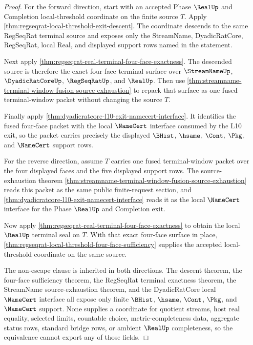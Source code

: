 \begin{proof}
For the forward direction, start with an accepted Phase $\RealUp$ and Completion local-threshold coordinate on the finite source $T$. Apply \autoref{thm:regseqrat-local-threshold-exit-descent}. The coordinate descends to the same RegSeqRat terminal source and exposes only the StreamName, DyadicRatCore, RegSeqRat, local Real, and displayed support rows named in the statement.

Next apply \autoref{thm:regseqrat-real-terminal-four-face-exactness}. The descended source is therefore the exact four-face terminal surface over $\StreamNameUp$, $\DyadicRatCoreUp$, $\RegSeqRatUp$, and $\RealUp$. Then use \autoref{thm:streamname-terminal-window-fusion-source-exhaustion} to repack that surface as one fused terminal-window packet without changing the source $T$.

Finally apply \autoref{thm:dyadicratcore-l10-exit-namecert-interface}. It identifies the fused four-face packet with the local $\NameCert$ interface consumed by the L10 exit, so the packet carries precisely the displayed $\BHist$, $\hsame$, $\Cont$, $\Pkg$, and $\NameCert$ support rows.

For the reverse direction, assume $T$ carries one fused terminal-window packet over the four displayed faces and the five displayed support rows. The source-exhaustion theorem \autoref{thm:streamname-terminal-window-fusion-source-exhaustion} reads this packet as the same public finite-request section, and \autoref{thm:dyadicratcore-l10-exit-namecert-interface} reads it as the local $\NameCert$ interface for the Phase $\RealUp$ and Completion exit.

Now apply \autoref{thm:regseqrat-real-terminal-four-face-exactness} to obtain the local $\RealUp$ terminal seal on $T$. With that exact four-face surface in place, \autoref{thm:regseqrat-local-threshold-four-face-sufficiency} supplies the accepted local-threshold coordinate on the same source.

The non-escape clause is inherited in both directions. The descent theorem, the four-face sufficiency theorem, the RegSeqRat terminal exactness theorem, the StreamName source-exhaustion theorem, and the DyadicRatCore local $\NameCert$ interface all expose only finite $\BHist$, $\hsame$, $\Cont$, $\Pkg$, and $\NameCert$ support. None supplies a coordinate for quotient streams, host real equality, selected limits, countable choice, metric-completeness data, aggregate status rows, standard bridge rows, or ambient $\RealUp$ completeness, so the equivalence cannot export any of those fields.
\end{proof}

